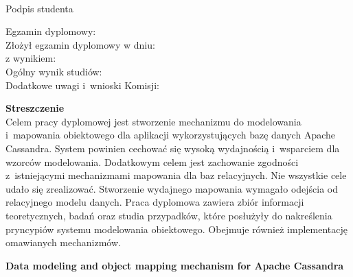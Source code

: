 \vspace{2cm}
 
\begin{flushright}
  \begin{minipage}{5cm}
   \dotfill \\[-0.7cm]
   \begin{center}
   \small Podpis studenta
   \end{center}
  \end{minipage}
 \end{flushright}
 
 \vspace{3cm}
 
 \begin{flushleft}
  Egzamin dyplomowy: \\
  Złożył egzamin dyplomowy w dniu: \dotfill \\
  z wynikiem: \dotfill \\
  Ogólny wynik studiów: \dotfill \\
  Dodatkowe uwagi i~wnioski Komisji: \dotfill \\
  \hspace{0cm} \dotfill
\end{flushleft}
 
  
\newpage
\thispagestyle{empty}
 
\textbf{Streszczenie} \\
 
  Celem pracy dyplomowej jest stworzenie mechanizmu do modelowania i~mapowania obiektowego dla aplikacji wykorzystujących bazę danych Apache Cassandra. System powinien cechować się wysoką wydajnością i~wsparciem dla wzorców modelowania. Dodatkowym celem jest zachowanie zgodności z~istniejącymi mechanizmami mapowania dla baz relacyjnych. Nie wszystkie cele udało się zrealizować. Stworzenie wydajnego mapowania wymagało odejścia od relacyjnego modelu danych. Praca dyplomowa zawiera zbiór informacji teoretycznych, badań oraz studia przypadków, które posłużyły do nakreślenia pryncypiów systemu modelowania obiektowego. Obejmuje również implementację omawianych mechanizmów.
 
 
 \begin{center}
  \large \textbf{Data modeling and object mapping mechanism for Apache Cassandra}
 \end{center}

 \vspace*{1cm}
 
